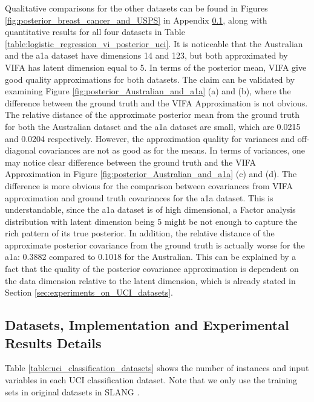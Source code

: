 \documentclass[10pt]{article} %
\begin{document}
Qualitative comparisons for the other datasets can be found in Figures \ref{fig:posterior_breast_cancer_and_USPS} in Appendix \ref{app:dataset_implementation_and_results_details}, along with quantitative results for all four datasets in Table \ref{table:logistic_regression_vi_posterior_uci}. It is noticeable that the Australian and the a1a dataset have dimensions 14 and 123, but both approximated by VIFA has latent dimension equal to 5. In terms of the posterior mean, VIFA give good quality approximations for both datasets. The claim can be validated by examining Figure \ref{fig:posterior_Australian_and_a1a} (a) and (b), where the difference between the ground truth and the VIFA Approximation is not obvious. The relative distance of the approximate posterior mean from the ground truth for both the Australian dataset and the a1a dataset are small, which are 0.0215 and 0.0204 respectively. However, the approximation quality for variances and off-diagonal covariances are not as good as for the means. In terms of variances, one may notice clear difference between the ground truth and the VIFA Approximation in Figure \ref{fig:posterior_Australian_and_a1a} (c) and (d). The difference is more obvious for the comparison between covariances from VIFA approximation and ground truth covariances for the a1a dataset. This is understandable, since the a1a dataset is of high dimensional, a Factor analysis distribution with latent dimension being 5 might be not enough to capture the rich pattern of its true posterior. In addition, the relative distance of the approximate posterior covariance from the ground truth is actually worse for the a1a: 0.3882 compared to 0.1018 for the Australian. 
This can be explained by a fact that the quality of the posterior covariance approximation is dependent on the data dimension relative to the latent dimension, which is already stated in Section \ref{sec:experiments_on_UCI_datasets}.

\subsection{Datasets, Implementation and Experimental Results Details}
\label{app:dataset_implementation_and_results_details}
Table \ref{table:uci_classification_datasets} shows the number of instances and input variables in each UCI classification dataset. Note that we only use the training sets in original datasets in SLANG \cite{mishkin2018}.
\end{document}
